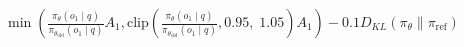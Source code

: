 \documentclass[preview]{standalone}
\begin{document}
\begin{align*}
\min \left(\frac{\pi_\theta(o_1 \mid q)}{\pi_{\theta_{\text{old}}}(o_1 \mid q)} A_1, \text{clip} \left( \frac{\pi_\theta(o_1 \mid q)}{\pi_{\theta_{\text{old}}}(o_1 \mid q)}, 0.95,\; 1.05 \right) A_1 \right) - 0.1 D_{KL}(\pi_\theta \parallel \pi_{\text{ref}})
\end{align*}
\end{document}
